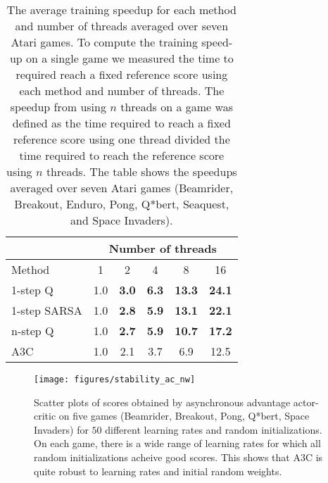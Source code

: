 \documentclass{article} \usepackage{times}
\begin{document}
\begin{table}[t]
\small
\begin{center}
\begin{tabular}{ | l | c | c | c | c | c | }
\hline
& \multicolumn{5}{|c|}{Number of threads} \\ \hline
Method & 1 & 2 & 4 & 8 & 16 \\
\hline
1-step Q & 1.0 & \textbf{3.0} & \textbf{6.3} & \textbf{13.3} & \textbf{24.1} \\ \hline
1-step SARSA & 1.0 & \textbf{2.8} & \textbf{5.9} & \textbf{13.1} & \textbf{22.1} \\ \hline
n-step Q & 1.0 & \textbf{2.7} & \textbf{5.9} & \textbf{10.7} & \textbf{17.2} \\ \hline
A3C & 1.0 & 2.1 & 3.7 & 6.9 & 12.5 \\ \hline
\end{tabular}
\caption{\label{fig-scalability} The average training speedup for each method and number of threads averaged over seven Atari games.
To compute the training speed-up on a single game we measured the time to required reach a fixed reference score using each method and number of threads.
The speedup from using $n$ threads on a game was defined as the time required to reach a fixed reference score using one thread divided the time required to reach the reference score using $n$ threads.
The table shows the speedups averaged over seven Atari games (Beamrider, Breakout, Enduro, Pong, Q*bert, Seaquest, and Space Invaders).
}
\end{center}
\vspace{-0.45cm}
\end{table}

\begin{figure*}[ht]
\centerline{\texttt{[image: figures/stability\_ac\_nw]}}
\vspace{-0.25cm}
\caption{\label{fig-stability-ac} Scatter plots of scores obtained by asynchronous advantage actor-critic on five games (Beamrider, Breakout, Pong, Q*bert, Space Invaders) for $50$ different learning rates and random initializations. On each game, there is a wide range of learning rates for which all random initializations acheive good scores.  This shows that A3C is quite robust to learning rates and initial random weights.}
\vspace{-0.45cm}
\end{figure*}
\end{document}
